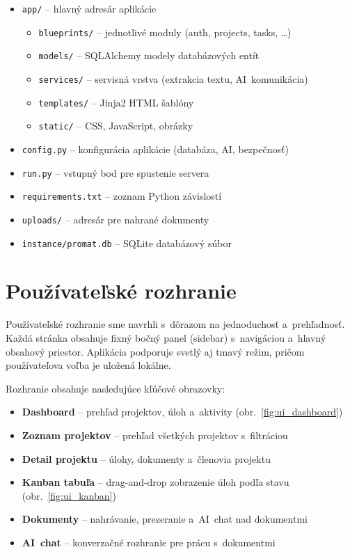 \begin{itemize}
  \item \texttt{app/} -- hlavný adresár aplikácie
  \begin{itemize}
    \item \texttt{blueprints/} -- jednotlivé moduly (auth, projects, tasks, \ldots)
    \item \texttt{models/} -- SQLAlchemy modely databázových entít
    \item \texttt{services/} -- servisná vrstva (extrakcia textu, AI~komunikácia)
    \item \texttt{templates/} -- Jinja2 HTML šablóny
    \item \texttt{static/} -- CSS, JavaScript, obrázky
  \end{itemize}
  \item \texttt{config.py} -- konfigurácia aplikácie (databáza, AI, bezpečnosť)
  \item \texttt{run.py} -- vstupný bod pre spustenie servera
  \item \texttt{requirements.txt} -- zoznam Python závislostí
  \item \texttt{uploads/} -- adresár pre nahrané dokumenty
  \item \texttt{instance/promat.db} -- SQLite databázový súbor
\end{itemize}

\section{Používateľské rozhranie}

        Používateľské rozhranie sme navrhli s~dôrazom na jednoduchosť a~prehľadnosť.
Každá stránka obsahuje fixný bočný panel (sidebar) s~navigáciou a~hlavný obsahový
priestor. Aplikácia podporuje svetlý aj tmavý režim, pričom používateľova voľba je
uložená lokálne.

        Rozhranie obsahuje nasledujúce kľúčové obrazovky:

\begin{itemize}
  \item \textbf{Dashboard} -- prehľad projektov, úloh a~aktivity (obr.~\ref{fig:ui_dashboard})
  \item \textbf{Zoznam projektov} -- prehľad všetkých projektov s~filtráciou
  \item \textbf{Detail projektu} -- úlohy, dokumenty a~členovia projektu
  \item \textbf{Kanban tabuľa} -- drag-and-drop zobrazenie úloh podľa stavu (obr.~\ref{fig:ui_kanban})
  \item \textbf{Dokumenty} -- nahrávanie, prezeranie a~AI~chat nad dokumentmi
  \item \textbf{AI~chat} -- konverzačné rozhranie pre prácu s~dokumentmi
\end{itemize}

